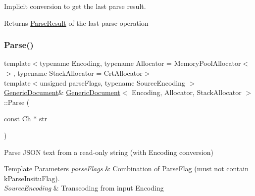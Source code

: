 Implicit conversion to get the last parse result. 

\begin{DoxyReturn}{Returns}
\hyperlink{structParseResult}{Parse\+Result} of the last parse operation
\end{DoxyReturn}

 \mbox{\label{classGenericDocument_aebd4e7fddd80c1e1174837aee6d2159b}} 
\subsubsection{\texorpdfstring{Parse()}{Parse()}\hspace{0.1cm}{\footnotesize\ttfamily [1/6]}}
{\footnotesize\ttfamily template$<$typename Encoding, typename Allocator = Memory\+Pool\+Allocator$<$$>$, typename Stack\+Allocator = Crt\+Allocator$>$ \\
template$<$unsigned parse\+Flags, typename Source\+Encoding $>$ \\
\hyperlink{classGenericDocument}{Generic\+Document}\& \hyperlink{classGenericDocument}{Generic\+Document}$<$ Encoding, Allocator, Stack\+Allocator $>$\+::Parse (\begin{DoxyParamCaption}\item[{const \hyperlink{classGenericValue_ade0e0ce64ccd5d852da57a35e720bafb}{Ch} $\ast$}]{str }\end{DoxyParamCaption})\hspace{0.3cm}{\ttfamily [inline]}}



Parse J\+S\+ON text from a read-\/only string (with Encoding conversion) 


\begin{DoxyTemplParams}{Template Parameters}
{\em parse\+Flags} & Combination of Parse\+Flag (must not contain k\+Parse\+Insitu\+Flag). \\
\hline
{\em Source\+Encoding} & Transcoding from input Encoding \\
\hline
\end{DoxyTemplParams}

